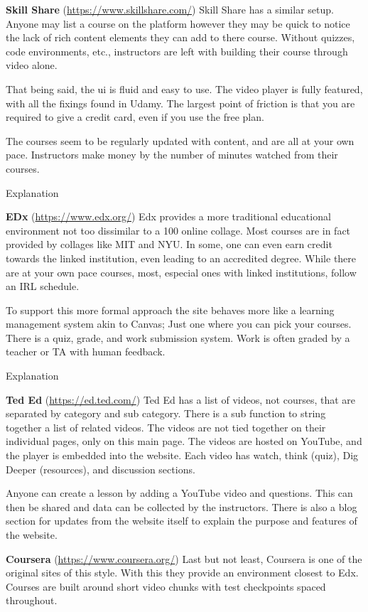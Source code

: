 \documentclass{article}
\begin{document}
\textbf{Skill Share} (\url{https://www.skillshare.com/})
Skill Share has a similar setup. Anyone may list a course on the platform
however they may be quick to notice the lack of rich content elements they can
add to there course. Without quizzes, code environments, etc., instructors are
left with building their course through video alone.

That being said, the ui is fluid and easy to use. The video player is fully
featured, with all the fixings found in Udamy. The largest point of friction is
that you are required to give a credit card, even if you use the free
plan.

The courses seem to be regularly updated with content, and are all at your own
pace. Instructors make money by the number of minutes watched from their
courses.

Explanation

\textbf{EDx} (\url{https://www.edx.org/})
Edx provides a more traditional educational environment not too dissimilar to a 100%
online collage. Most courses are in fact provided by collages like MIT and NYU.
In some, one can even earn credit towards the linked institution, even leading
to an accredited degree. While there are at your own pace courses,
most, especial ones with linked institutions, follow an IRL schedule.

To support this more formal approach the site behaves more like a learning
management system akin to Canvas; Just one where you can pick your courses.
There is a quiz, grade, and work submission system. Work is often graded by a
teacher or TA with human feedback.

Explanation

\textbf{Ted Ed} (\url{https://ed.ted.com/})
Ted Ed has a list of videos, not courses, that are separated by category and sub category. There is a sub function to string together a list of related videos. The videos are not tied together on their individual pages, only on this main page. The videos are hosted on YouTube, and the player is embedded into the website. Each video has watch, think (quiz), Dig Deeper (resources), and discussion sections.

Anyone can create a lesson by adding a YouTube video and questions. This can then be shared and data can be collected by the instructors. There is also a blog section for updates from the website itself to explain the purpose and features of the website.

\textbf{Coursera} (\url{https://www.coursera.org/})
Last but not least, Coursera is one of the original sites of this style. With
this they provide an environment closest to Edx. Courses are built around short
video chunks with test checkpoints spaced throughout.
\end{document}
